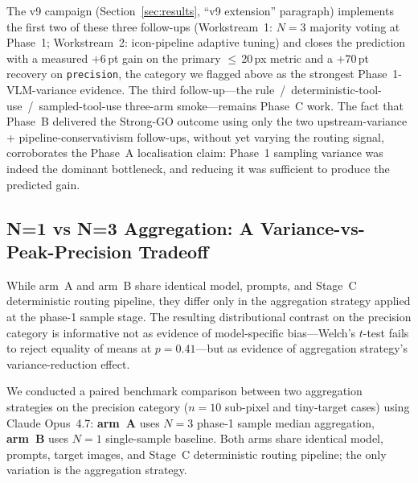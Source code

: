 The v9 campaign (Section~\ref{sec:results}, ``v9 extension''
paragraph) implements the first two of these three follow-ups
(Workstream~1: $N=3$ majority voting at Phase~1; Workstream~2:
icon-pipeline adaptive tuning) and closes the prediction with a
measured $+6$\,pt gain on the primary $\leq$\,20\,px metric and a
$+70$\,pt recovery on \texttt{precision}, the category we flagged
above as the strongest Phase~1-VLM-variance evidence.  The third
follow-up---the rule~/~deterministic-tool-use~/~sampled-tool-use
three-arm smoke---remains Phase~C work.  The fact that Phase~B
delivered the Strong-GO outcome using only the two
upstream-variance + pipeline-conservativism follow-ups, without
yet varying the routing signal, corroborates the Phase~A
localisation claim: Phase~1 sampling variance was indeed the
dominant bottleneck, and reducing it was sufficient to produce the
predicted gain.


\subsection{N=1 vs N=3 Aggregation: A Variance-vs-Peak-Precision Tradeoff}
\label{sec:aggregation-discussion}

While arm~A and arm~B share identical model, prompts, and
Stage~C deterministic routing pipeline, they differ only in
the aggregation strategy applied at the phase-1 sample stage.
The resulting distributional contrast on the precision
category is informative not as evidence of model-specific
bias---Welch's $t$-test fails to reject equality of means at
$p=0.41$---but as evidence of aggregation strategy's
variance-reduction effect.

We conducted a paired benchmark comparison between two
aggregation strategies on the precision category ($n=10$
sub-pixel and tiny-target cases) using Claude Opus~4.7:
\textbf{arm~A} uses $N=3$ phase-1 sample median aggregation,
\textbf{arm~B} uses $N=1$ single-sample baseline.  Both arms
share identical model, prompts, target images, and Stage~C
deterministic routing pipeline; the only variation is the
aggregation strategy.

